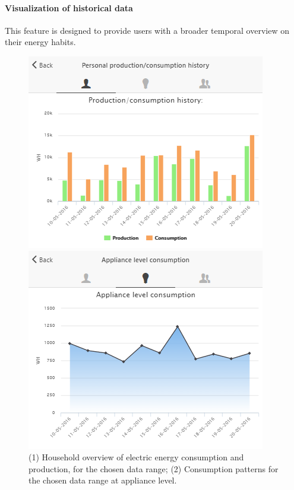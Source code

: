 \paragraph{Visualization of historical data} 

This feature is designed to provide users with a broader temporal overview on their energy habits.
\begin{figure}
      \begin{center}
        \begin{minipage}[htb]{0.45\linewidth}    
         \includegraphics[width=1\linewidth]{img/historicalcomparison_prodcons.png}
        \end{minipage}
	\hfill 
        \begin{minipage}[htb]{0.45\linewidth}    
         \includegraphics[width=1\linewidth]{img/applianceconsumption.png}
        \end{minipage}
      \end{center}
      \caption{(1) Household overview of electric energy consumption and production, for the chosen data range; (2) Consumption patterns for the chosen data range at appliance level.
}
\label{fig:viz_hist}
\end{figure}
